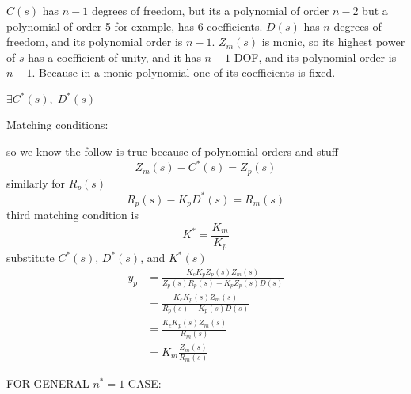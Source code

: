 $C(s)$ has $n-1$ degrees of freedom, but its a polynomial of order $n-2$ but a polynomial of order 5 for example, has 6 coefficients.
$D(s)$ has $n$ degrees of freedom, and its polynomial order is $n-1$.
$Z_{m}(s)$ is monic, so its highest power of $s$ has a coefficient of unity, and it has $n-1$ DOF, and its polynomial order is $n-1$.
Because in a monic polynomial one of its coefficients is fixed.

$\exists C^{*}(s),\;D^{*}(s)$

Matching conditions:

so we know the follow is true because of polynomial orders and stuff
\begin{equation*}
  Z_{m}(s)-C^{*}(s)=Z_{p}(s)
\end{equation*}
similarly for $R_{p}(s)$
\begin{equation*}
  R_{p}(s)-K_{p}D^{*}(s)=R_{m}(s)
\end{equation*}
third matching condition is
\begin{equation*}
  K^{*}=\frac{K_{m}}{K_{p}}
\end{equation*}
substitute $C^{*}(s)$, $D^{*}(s)$, and $K^{*}(s)$
\begin{align*}
  y_{p}&=\frac{K_{c}K_{p}Z_{p}(s)Z_{m}(s)}{Z_{p}(s)R_{p}(s)-K_{p}Z_{p}(s)D(s)} \\
  &=\frac{K_{c}K_{p}(s)Z_{m}(s)}{R_{p}(s)-K_{p}(s)D(s)} \\
  &=\frac{K_{c}K_{p}(s)Z_{m}(s)}{R_{m}(s)} \\
  &=K_{m}\frac{Z_{m}(s)}{R_{m}(s)}
\end{align*}

FOR GENERAL $n^{*}=1$ CASE:\@

